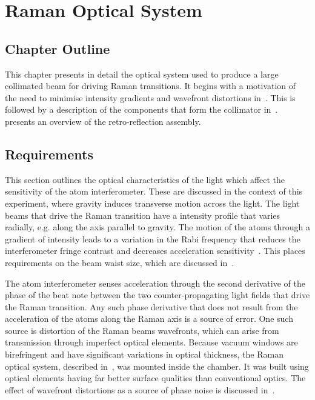 \chapter{Raman Optical System}\label{chap:raman_optics}

\section{Chapter Outline}
This chapter presents in detail the optical system used to produce a
large collimated beam for driving Raman transitions. It begins with a
motivation of the need to minimise intensity gradients and wavefront distortions 
in~. This is followed by a description
of the components that form the collimator
in~.
 presents an overview of the
retro-reflection assembly.
\section{Requirements}\label{sec:wavefront_req}
This section
outlines the optical characteristics of the light which affect the
sensitivity of the atom interferometer. These are discussed in the
context of this experiment, where gravity induces transverse motion
across the light. The light beams that drive the Raman transition have
a intensity profile that varies radially, e.g. along the axis parallel
to gravity. The motion of the atoms through
a gradient of intensity leads to a variation in the Rabi frequency that reduces the interferometer fringe
contrast and decreases acceleration sensitivity~\cite{Kim2017}.
This places requirements on the beam waist size, which are discussed
in~. 
\par\noindent
The atom interferometer senses acceleration through the second
derivative of the phase of the beat note between the two
counter-propagating light fields that drive the Raman transition. Any
such phase derivative that does not result from the acceleration of the atoms along
the Raman axis is a source of error.
One such source is distortion of the Raman beams wavefronts, which can
arise from transmission through imperfect optical elements.
Because vacuum windows are birefringent and have significant
variations in optical thickness, the Raman optical system, described
in~, was mounted inside the
chamber. It was built using optical elements having 
far better surface
qualities than conventional optics. 
The effect of wavefront distortions as a source of phase noise is
discussed in~.
